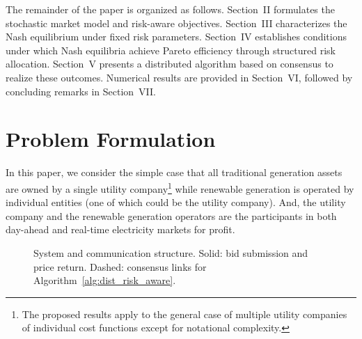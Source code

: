 \documentclass[conference]{IEEEtran}
\begin{document}
The remainder of the paper is organized as follows.
Section~II formulates the stochastic market model and risk-aware objectives.
Section~III characterizes the Nash equilibrium under fixed risk parameters.
Section~IV establishes conditions under which Nash equilibria achieve Pareto efficiency through structured risk allocation.
Section~V presents a distributed algorithm based on consensus to realize these outcomes.
Numerical results are provided in Section~VI, followed by concluding remarks in Section~VII.

\section{Problem Formulation}

In this paper, we consider the simple case that all traditional generation assets are owned by a single utility company\footnote{The proposed results apply to the general case of multiple utility companies of individual cost functions except for notational complexity.} while renewable generation is operated by individual entities (one of which could be the utility company). And, the utility company and the renewable generation operators are the participants in both day-ahead and real-time electricity markets for profit. 

\begin{figure}[hbt!]
\centering
{}
\caption{System and communication structure. Solid: bid submission and price return. Dashed: consensus links for Algorithm~\ref{alg:dist_risk_aware}.}
\label{fig:system_schematic}
\end{figure}
\end{document}
